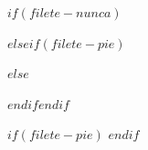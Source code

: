 $if(filete-nunca)$
\usepackage[norule]{footmisc}
$else$$if(filete-pie)$
\usepackage[splitrule]{footmisc}
$else$
\usepackage[norule,splitrule]{footmisc}
$endif$$endif$

\renewcommand{\footnotesize}{\small}

\makeatletter
\newcommand{\@footrule}{%
  \kern-3\p@
  \hrule \@width 1.5in \@height 0.6pt
  \kern 2.6\p@
}
\let\splitfootnoterule\@footrule
$if(filete-pie)$
\let\pagefootnoterule\@footrule
$endif$
\makeatother

\renewcommand{\thefootnote}{%
  \textcolor{black}{$if(titulos-sans)${\sffamily\arabic{footnote}}$else$\arabic{footnote}$endif$}%
}

\makeatletter
\renewcommand{\@makefntext}[1]{%
  \parindent=\ParIndent%
  \@enumdepth=0\relax%
  \@itemdepth=0\relax%
  \noindent
$if(notas-sin-sangria)$%
$else$%
  \hspace*{\ParIndent}%
$endif$%
$if(nota-numeracion-linea)$
  $if(titulos-sans)${\sffamily\arabic{footnote}}$else$\arabic{footnote}$endif$.
$else$%
  \@makefnmark%
$endif$%
  \hspace{0.5em}#1%
}
\makeatother
